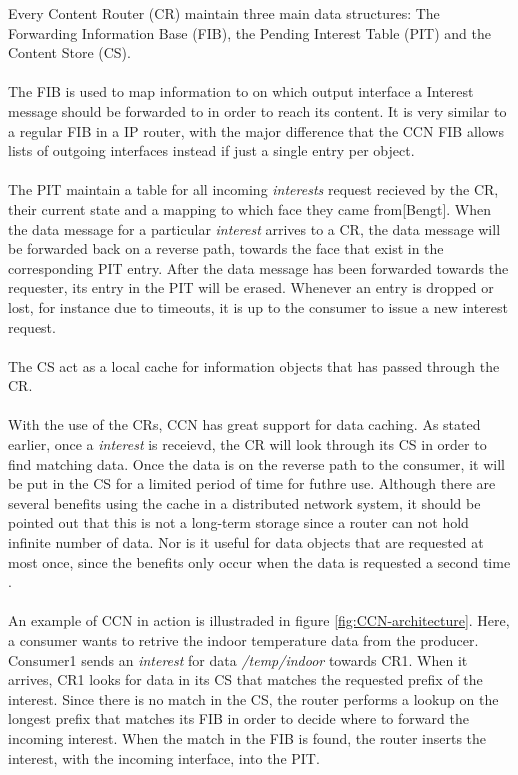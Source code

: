 Every Content Router (CR) maintain three main data structures: The Forwarding Information Base (FIB), the Pending Interest Table (PIT) and the Content Store (CS).
\\\\
The FIB is used to map information to on which output interface a Interest message should be forwarded to in order to reach its content. It is very similar to a regular FIB in a IP router, with the major difference that the CCN FIB allows lists of outgoing interfaces instead if just a single entry per object.
\\\\
The PIT maintain a table for all incoming \textit{interests} request recieved by the CR, their current state and a mapping to which face they came from[Bengt]. When the data message for a particular \textit{interest} arrives to a CR, the data message will be forwarded back on a reverse path, towards the face that exist in the corresponding PIT entry. After the data message has been forwarded towards the requester, its entry in the PIT will be erased. Whenever an entry is dropped or lost, for instance due to timeouts, it is up to the consumer to issue a new interest request.\
\\\\
The CS act as a local cache for information objects that has passed through the CR.
\\\\
With the use of the CRs, CCN has great support for data caching. As stated earlier, once a \textit{interest} is receievd, the CR will look through its CS in order to find matching data. Once the data is on the reverse path to the consumer, it will be put in the CS for a limited period of time for futhre use. Although there are several benefits using the cache in a distributed network system, it should be pointed out that this is not a long-term storage since a router can not hold infinite number of data. Nor is it useful for data objects that are requested at most once, since the benefits only occur when the data is requested a second time \cite{Ahlgreniot}\cite{Ahlgren2012}. %
\\\\
An example of CCN in action is illustraded in figure \ref{fig:CCN-architecture}. Here, a consumer wants to retrive the indoor temperature data from the producer.
Consumer1 sends an \textit{interest} for data \textit{/temp/indoor} towards CR1. When it arrives, CR1 looks for data in its CS that matches the requested prefix of the interest. Since there is no match in the CS, the router performs a lookup on the longest prefix that matches its FIB in order to decide where to forward the incoming interest. When the match in the FIB is found, the router inserts the interest, with the incoming interface, into the PIT.\\
